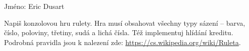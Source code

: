 \documentclass{exam}
\begin{document}
Jméno: Eric Dusart
\begin{questions}
  \question[100]
  Napiš konzolovou hru rulety. Hra musí obsahovat všechny typy sázení --
  barva, číslo, poloviny, třetiny, sudá a lichá čísla. Též implementuj hlídání
  kreditu. Podrobná pravidla jsou k nalezení zde: \url{https://cs.wikipedia.org/wiki/Ruleta}.
\end{questions}
\end{document}
